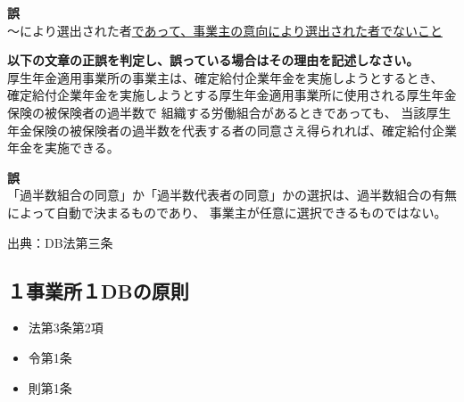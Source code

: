 \begin{answerbox}
 \textbf{誤} \\
  〜により選出された者\underline{であって、事業主の意向により選出された者でないこと}
\end{answerbox}

\begin{truefalse}[自作 \ 2026/10/4]
\textbf{以下の文章の正誤を判定し、誤っている場合はその理由を記述しなさい。}
\\

厚生年金適用事業所の事業主は、確定給付企業年金を実施しようとするとき、
確定給付企業年金を実施しようとする厚生年金適用事業所に使用される厚生年金保険の被保険者の過半数で
組織する労働組合があるときであっても、
当該厚生年金保険の被保険者の過半数を代表する者の同意さえ得られれば、確定給付企業年金を実施できる。
\end{truefalse}

\begin{answerbox}
 \textbf{誤} \\
  「過半数組合の同意」か「過半数代表者の同意」かの選択は、過半数組合の有無によって自動で決まるものであり、
  事業主が任意に選択できるものではない。
\end{answerbox}

\begin{explanationbox}
  出典：DB法第三条
\end{explanationbox}

\newpage

\subsection{１事業所１DBの原則}



\begin{InyouJobunbox}
  \begin{itemize}
    \item 法第3条第2項
    \item 令第1条
    \item 則第1条
  \end{itemize}
\end{InyouJobunbox}


